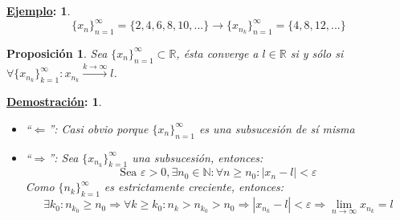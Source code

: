 \documentclass[10pt,a4paper,openright]{book}
\theoremstyle{break}
\newtheorem*{prop}{Proposición}
\newtheorem*{demo}{\underline{Demostración}:}
\newtheorem*{ej}{\underline{Ejemplo}:}
\begin{document}
\begin{ej}
$$\{x_n\}_{n=1}^\infty =\{2,4,6,8,10,...\}\rightarrow \{x_{n_k}\}_{n=1}^\infty =\{4,8,12,...\}$$
\end{ej}

\begin{prop}
Sea $\{x_n\}_{n=1}^\infty\subset \mathbb R$, ésta converge a $l\in \mathbb R$ si y sólo si $\forall \{x_{n_k}\}_{k=1}^\infty : x_{n_k}\xrightarrow{k\rightarrow \infty} l$.
\end{prop}
\begin{demo}
\begin{itemize}
\item ``$\Leftarrow$'':
	Casi obvio porque $\{x_n\}_{n=1}^\infty$ es una subsucesión de sí misma
	
\item ``$\Rightarrow$'':
	Sea $\{x_{n_k}\}_{k=1}^\infty$ una subsucesión, entonces:
	$$\mbox{Sea }\varepsilon>0, \exists n_0\in \mathbb N: \forall n\geq n_0: \left|x_n-l\right|<\varepsilon$$
	Como $\{n_k\}_{k=1}^\infty$ es estrictamente creciente, entonces:
	$$\exists k_0: n_{k_0}\geq n_0\Rightarrow \forall k\geq k_0: n_k>n_{k_0}>n_0\Rightarrow \left|x_{n_k}-l\right|<\varepsilon\Rightarrow \lim_{n\rightarrow \infty} x_{n_k}=l$$
\end{itemize}
\end{demo}
\end{document}
